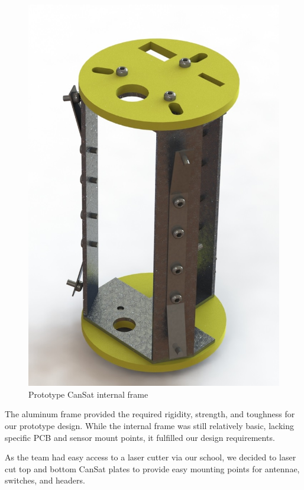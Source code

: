 \documentclass[]{report}
\begin{document}
\begin{figure}[h]
	\hfill\includegraphics[scale=0.4]{old_int_frame.jpg}\hspace*{\fill}
	\caption{Prototype CanSat internal frame}
	\label{intframeold}
\end{figure}

The aluminum frame provided the required rigidity, strength, and toughness for our prototype design. While the internal frame was still relatively basic, lacking specific PCB and sensor mount points, it fulfilled our design requirements.

As the team had easy access to a laser cutter via our school, we decided to laser cut top and bottom CanSat plates to provide easy mounting points for antennae, switches, and headers.
\end{document}
